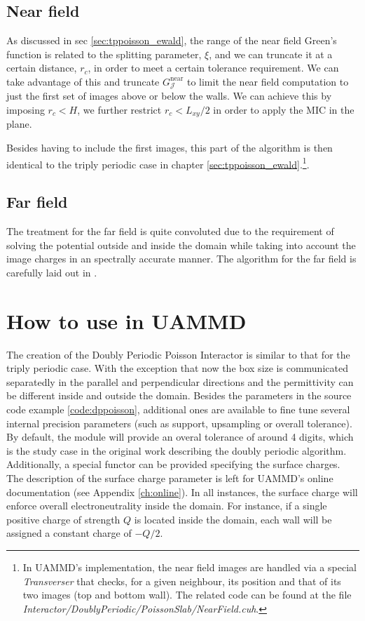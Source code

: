 \documentclass[ twoside,openright,titlepage,numbers=noenddot,%
headinclude,footinclude,cleardoublepage=empty,abstract=on,
BCOR=5mm,paper=a4,fontsize=11pt, dvipsnames
]{scrreprt}
\newcommand{\oper}[1]{\mathcal{#1}}
\newcommand{\uammd}{\gls{UAMMD}\xspace}
\newcommand{\near}{\textrm{near}}
\begin{document}
\subsection{Near field}
As discussed in sec \ref{sec:tppoisson_ewald}, the range of the near field Green's function is related to the splitting parameter, $\xi$, and we can truncate it at a certain distance, $r_{c}$, in order to meet a certain tolerance requirement. We can take advantage of this and truncate $G_{\oper{J}}^{\near}$ to limit the near field computation to just the first set of images above or below the walls. We can achieve this by imposing $r_c<H$, we further restrict $r_c < L_{xy}/2$ in order to apply the \gls{MIC} in the plane.

Besides having to include the first images, this part of the algorithm is then identical to the triply periodic case in chapter \ref{sec:tppoisson_ewald}.\footnote{In \uammd's implementation, the near field images are handled via a special \emph{Transverser} that checks, for a given neighbour, its position and that of its two images (top and bottom wall). The related code can be found at the file \emph{Interactor/DoublyPeriodic/PoissonSlab/NearField.cuh}.}.
\subsection{Far field}

The treatment for the far field is quite convoluted due to the requirement of solving the potential outside and inside the domain while taking into account the image charges in an spectrally accurate manner. The algorithm for the far field is carefully laid out in \cite{Maxian2021}.

\section{How to use in UAMMD}
The creation of the Doubly Periodic Poisson Interactor is similar to that for the triply periodic case. With the exception that now the box size is communicated separatedly in the parallel and perpendicular directions and the permittivity can be different inside and outside the domain. Besides the parameters in the source code example \ref{code:dppoisson}, additional ones are available to fine tune several internal precision parameters (such as support, upsampling or overall tolerance). By default, the module will provide an overal tolerance of around 4 digits, which is the study case in the original work describing the doubly periodic algorithm\cite{Maxian2021}. Additionally, a special functor can be provided specifying the surface charges. The description of the surface charge parameter is left for UAMMD's online documentation (see Appendix \ref{ch:online}).
In all instances, the surface charge will enforce overall electroneutrality inside the domain. For instance, if a single positive charge of strength $Q$ is located inside the domain, each wall will be assigned a constant charge of $-Q/2$.
\end{document}
